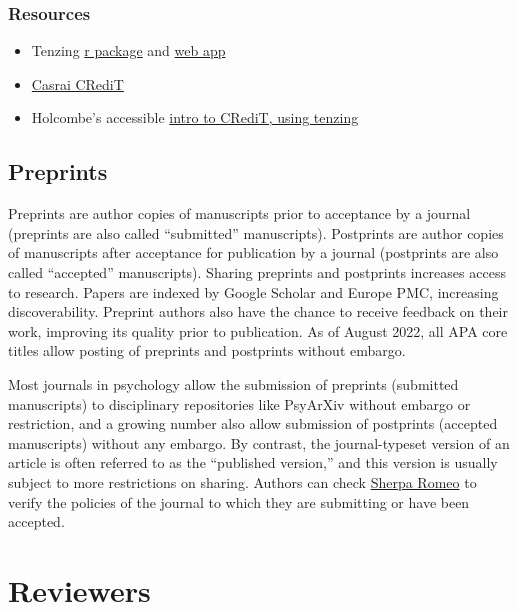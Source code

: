 \documentclass[
  oneside]{book}
\providecommand{\tightlist}{%
  \setlength{\itemsep}{0pt}\setlength{\parskip}{0pt}}
\begin{document}
\hypertarget{resources-10}{%
\section{Resources}\label{resources-10}}

\begin{itemize}
\tightlist
\item
  Tenzing \href{https://marton-balazs-kovacs.github.io/tenzing/}{r package} and \href{https://tenzing.club/}{web app}
\item
  \href{https://casrai.org/credit/}{Casrai CRediT}
\item
  Holcombe's accessible \href{https://alexholcombe.medium.com/announcing-tenzing-ceca6789d88c}{intro to CRediT, using tenzing}
\end{itemize}

\hypertarget{authors-preprints}{%
\chapter{Preprints}\label{authors-preprints}}

Preprints are author copies of manuscripts prior to acceptance by a journal (preprints are also called ``submitted'' manuscripts). Postprints are author copies of manuscripts after acceptance for publication by a journal (postprints are also called ``accepted'' manuscripts). Sharing preprints and postprints increases access to research. Papers are indexed by Google Scholar and Europe PMC, increasing discoverability. Preprint authors also have the chance to receive feedback on their work, improving its quality prior to publication. As of August 2022, all APA core titles allow posting of preprints and postprints without embargo.

Most journals in psychology allow the submission of preprints (submitted manuscripts) to disciplinary repositories like PsyArXiv without embargo or restriction, and a growing number also allow submission of postprints (accepted manuscripts) without any embargo. By contrast, the journal-typeset version of an article is often referred to as the ``published version,'' and this version is usually subject to more restrictions on sharing. Authors can check \href{https://v2.sherpa.ac.uk/romeo/}{Sherpa Romeo} to verify the policies of the journal to which they are submitting or have been accepted.

\hypertarget{part-reviewers}{%
\part{Reviewers}\label{part-reviewers}}
\end{document}
